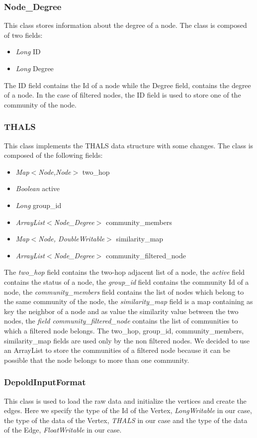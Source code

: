 \documentclass[12pt]{article}
\begin{document}
\subsubsection{Node\_Degree}
This class stores information about the degree of a node.
The class is composed of two fields:
\begin{itemize}
    \item \emph{Long} ID
    \item \emph{Long} Degree
\end{itemize}
    The ID field contains the Id of a node while the Degree field, contains the degree of a node.
    In the case of filtered nodes, the ID field is used to store one of the community of the node.
\subsubsection{THALS}
This class implements the THALS data structure with some changes.
The class is composed of the following fields:
\begin{itemize}
    \item \emph{Map$<$Node,Node$>$} two\_hop
    \item \emph{Boolean} active
    \item \emph{Long} group\_id
    \item \emph{ArrayList$<$Node\_Degree$>$} community\_members
    \item \emph{Map$<$Node, DoubleWritable$>$} similarity\_map
    \item \emph{ArrayList$<$Node\_Degree$>$} community\_filtered\_node
\end{itemize}
    The \emph{two\_hop} field contains the two-hop adjacent list of a node, the \emph{active} field contains the status of a node, the \emph{group\_id} field contains the community Id of a node, the \emph{community\_members} field contains the list of nodes which belong to the same community of the node, the \emph{similarity\_map} field is a map containing as key the neighbor of a node and as value the similarity value between the two nodes, the \emph{field community\_filtered\_node} contains the list of communities to which a filtered node belongs.
    The two\_hop, group\_id, community\_members, similarity\_map fields are used only by the non filtered nodes.
    We decided to use an ArrayList to store the communities of a filtered node because it can be possible that the node belongs to more than one community.
\subsubsection{DepoldInputFormat}
This class is used to load the raw data and initialize the vertices and create the edges.
Here we specify the type of the Id of the Vertex, \emph{LongWritable} in our case, the type of the data of the Vertex, \emph{THALS} in our case and the type of the data of the Edge, \emph{FloatWritable} in our case.
\end{document}
